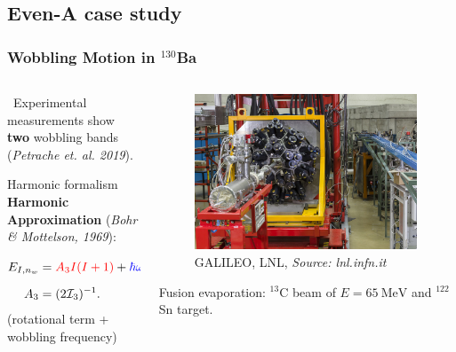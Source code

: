 \documentclass{beamer}
\begin{document}
\subsection{Even-A case study}

\begin{frame}
	\frametitle{Wobbling Motion in $^{130}$Ba}
	\begin{columns}
		\begin{column}{0.55\textwidth}
			\faSearch\ Experimental measurements show \textbf{two} wobbling bands (\textit{Petrache et. al. 2019}).
			\begin{exampleblock}{Harmonic formalism}
				\textbf{Harmonic Approximation} (\textit{Bohr \& Mottelson, 1969}):
				\begin{align}
					E_{I,n_w}&={\color{red}A_3I(I+1)}+{\color{blue}\hbar\omega_w\left(n_w+\frac{1}{2}\right)}\nonumber,\\
					A_3&=(2\mathcal{I}_3)^{-1}\nonumber.
				\end{align}
				({\color{red}rotational term} + {\color{blue}wobbling frequency})
			\end{exampleblock}
		\end{column}
		\begin{column}{0.45\textwidth}
			\begin{figure}
				\centering
				\includegraphics[width=0.99\textwidth]{figures/galileo_exp.jpg}
				{\footnotesize GALILEO, LNL, \textit{Source: lnl.infn.it}}
			\end{figure}
			{\footnotesize Fusion evaporation: $^{13}$C beam of $E=65\ \text{MeV}$ and $^{122}$Sn target.}
		\end{column}
	\end{columns}
\end{frame}
\end{document}
